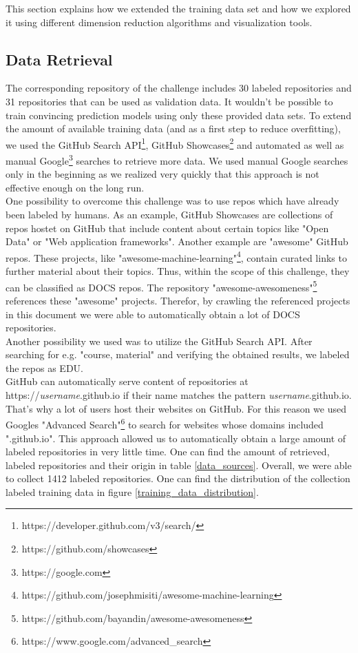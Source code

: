 \documentclass[%
a4paper,
DIV12,
2.5headlines,
bigheadings,
titlepage,
openbib,
]{scrartcl}
\begin{document}
This section explains how we extended the training data set and how we explored it using different dimension reduction algorithms and visualization tools.

\subsection{Data Retrieval}\label{data-retrieval}

The corresponding repository of the challenge includes 30 labeled repositories and 31 repositories that can be used as validation data.
It wouldn't be possible to train convincing prediction models using only these provided data sets.
To extend the amount of available training data (and as a first step to reduce overfitting), we used the GitHub Search API\footnote{https://developer.github.com/v3/search/}, GitHub Showcases\footnote{https://github.com/showcases} and automated as well as manual Google\footnote{https://google.com} searches to retrieve more data.
We used manual Google searches only in the beginning as we realized very quickly that this approach is not effective enough on the long run.\\
One possibility to overcome this challenge was to use repos which have already been labeled by humans.
As an example, GitHub Showcases are collections of repos hostet on GitHub that include content about certain topics like "Open Data" or "Web application frameworks".
Another example are "awesome" GitHub repos.
These projects, like "awesome-machine-learning"\footnote{https://github.com/josephmisiti/awesome-machine-learning}, contain curated links to further material about their topics.
Thus, within the scope of this challenge, they can be classified as DOCS repos.
The repository "awesome-awesomeness"\footnote{https://github.com/bayandin/awesome-awesomeness} references these "awesome" projects.
Therefor, by crawling the referenced projects in this document we were able to automatically obtain a lot of DOCS repositories.\\
Another possibility we used was to utilize the GitHub Search API.
After searching for e.g. "course, material" and verifying the obtained results, we labeled the repos as EDU.\\
GitHub can automatically serve content of repositories at https://\textit{username}.github.io if their name matches the pattern \textit{username}.github.io.
That's why a lot of users host their websites on GitHub.
For this reason we used Googles "Advanced Search"\footnote{https://www.google.com/advanced\_search} to search for websites whose domains included ".github.io".
This approach allowed us to automatically obtain a large amount of labeled repositories in very little time.
One can find the amount of retrieved, labeled repositories and their origin in table \ref{data_sources}.
Overall, we were able to collect 1412 labeled repositories.
One can find the distribution of the collection labeled training data in figure \ref{training_data_distribution}.
\end{document}
